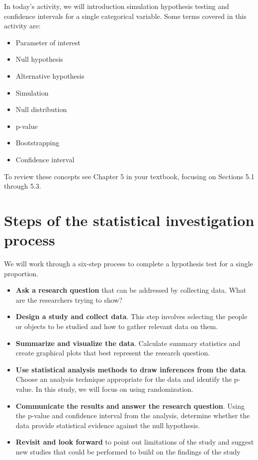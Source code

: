 \documentclass[
]{report}
\begin{document}
In today's activity, we will introduction simulation hypothesis testing and confidence intervals for a single categorical variable. Some terms covered in this activity are:

\begin{itemize}
\item
  Parameter of interest
\item
  Null hypothesis
\item
  Alternative hypothesis
\item
  Simulation
\item
  Null distribution
\item
  p-value
\item
  Bootstrapping
\item
  Confidence interval
\end{itemize}

To review these concepts see Chapter 5 in your textbook, focusing on Sections 5.1 through 5.3.

\hypertarget{steps-of-the-statistical-investigation-process}{%
\section{Steps of the statistical investigation process}\label{steps-of-the-statistical-investigation-process}}

We will work through a six-step process to complete a hypothesis test for a single proportion.

\begin{itemize}
\item
  \textbf{Ask a research question} that can be addressed by collecting data. What are the researchers trying to show?
\item
  \textbf{Design a study and collect data}. This step involves selecting the people or objects to be studied and how to gather relevant data on them.
\item
  \textbf{Summarize and visualize the data}. Calculate summary statistics and create graphical plots that best represent the research question.
\item
  \textbf{Use statistical analysis methods to draw inferences from the data}. Choose an analysis technique appropriate for the data and identify the p-value. In this study, we will focus on using randomization.
\item
  \textbf{Communicate the results and answer the research question}. Using the p-value and confidence interval from the analysis, determine whether the data provide statistical evidence against the null hypothesis.
\item
  \textbf{Revisit and look forward} to point out limitations of the study and suggest new studies that could be performed to build on the findings of the study
\end{itemize}
\end{document}
